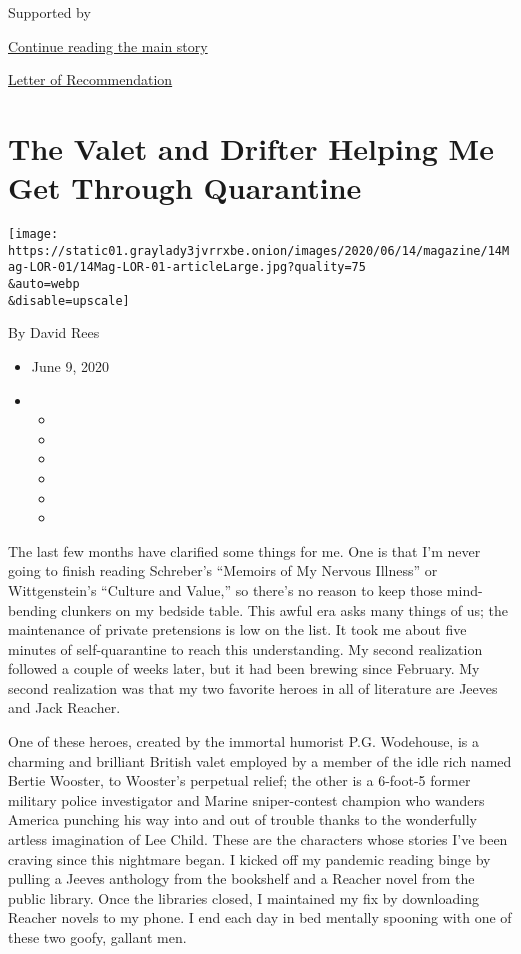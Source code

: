 Supported by

\protect\hyperlink{after-sponsor}{Continue reading the main story}

\href{/column/letter-of-recommendation}{Letter of Recommendation}

\hypertarget{the-valet-and-drifter-helping-me-get-through-quarantine}{%
\section{The Valet and Drifter Helping Me Get Through
Quarantine}\label{the-valet-and-drifter-helping-me-get-through-quarantine}}

\texttt{[image: https://static01.graylady3jvrrxbe.onion/images/2020/06/14/magazine/14Mag-LOR-01/14Mag-LOR-01-articleLarge.jpg?quality=75\\\&auto=webp\\\&disable=upscale]}

By David Rees

\begin{itemize}
\item
  June 9, 2020
\item
  \begin{itemize}
  \item
  \item
  \item
  \item
  \item
  \item
  \end{itemize}
\end{itemize}

The last few months have clarified some things for me. One is that I'm
never going to finish reading Schreber's ``Memoirs of My Nervous
Illness'' or Wittgenstein's ``Culture and Value,'' so there's no reason
to keep those mind-bending clunkers on my bedside table. This awful era
asks many things of us; the maintenance of private pretensions is low on
the list. It took me about five minutes of self-quarantine to reach this
understanding. My second realization followed a couple of weeks later,
but it had been brewing since February. My second realization was that
my two favorite heroes in all of literature are Jeeves and Jack Reacher.

One of these heroes, created by the immortal humorist P.G. Wodehouse, is
a charming and brilliant British valet employed by a member of the idle
rich named Bertie Wooster, to Wooster's perpetual relief; the other is a
6-foot-5 former military police investigator and Marine sniper-contest
champion who wanders America punching his way into and out of trouble
thanks to the wonderfully artless imagination of Lee Child. These are
the characters whose stories I've been craving since this nightmare
began. I kicked off my pandemic reading binge by pulling a Jeeves
anthology from the bookshelf and a Reacher novel from the public
library. Once the libraries closed, I maintained my fix by downloading
Reacher novels to my phone. I end each day in bed mentally spooning with
one of these two goofy, gallant men.

